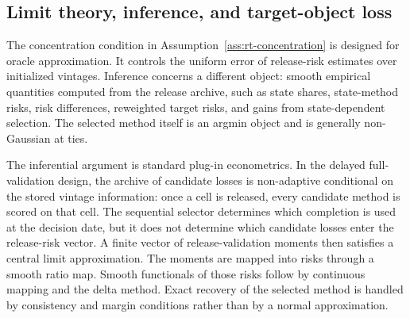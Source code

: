 \documentclass[a4paper, 12pt]{article}
\theoremstyle{plain}
\theoremstyle{remark}
\newcommand{\1}{\mathbf{1}}
\begin{document}
\subsection{Limit theory, inference, and target-object loss}
\label{subsec:rt-inference}

The concentration condition in Assumption~\ref{ass:rt-concentration} is designed for oracle approximation. It controls the uniform error of release-risk estimates over initialized vintages. Inference concerns a different object: smooth empirical quantities computed from the release archive, such as state shares, state-method risks, risk differences, reweighted target risks, and gains from state-dependent selection. The selected method itself is an argmin object and is generally non-Gaussian at ties.

The inferential argument is standard plug-in econometrics. In the delayed full-validation design, the archive of candidate losses is non-adaptive conditional on the stored vintage information: once a cell is released, every candidate method is scored on that cell. The sequential selector determines which completion is used at the decision date, but it does not determine which candidate losses enter the release-risk vector. A finite vector of release-validation moments then satisfies a central limit approximation. The moments are mapped into risks through a smooth ratio map. Smooth functionals of those risks follow by continuous mapping and the delta method. Exact recovery of the selected method is handled by consistency and margin conditions rather than by a normal approximation.
\end{document}
